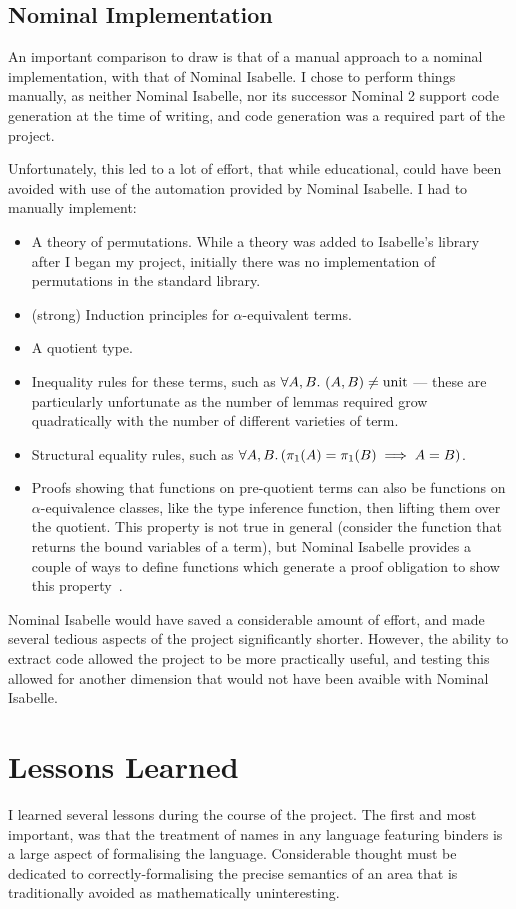 \subsection{Nominal Implementation}
An important comparison to draw is that of a manual approach to a nominal implementation, with that of Nominal Isabelle.
I chose to perform things manually, as neither Nominal Isabelle, nor its successor Nominal 2 support code generation at the time of writing, and code generation was a required part of the project.

Unfortunately, this led to a lot of effort, that while educational, could have been avoided with use of the automation provided by Nominal Isabelle.
I had to manually implement:
\begin{itemize}
\item
A theory of permutations.
While a theory was added to Isabelle's library after I began my project, initially there was no implementation of permutations in the standard library.
\item
(strong) Induction principles for \(\alpha\)-equivalent terms.
\item
A quotient type.
\item
Inequality rules for these terms, such as \(\forall A, B.\ (A, B) \neq \mathrm{unit}\) --- these are particularly unfortunate as the number of lemmas required grow quadratically with the number of different varieties of term.
\item
Structural equality rules, such as \(\forall A, B.\left(\pi_1(A) = \pi_1(B) \implies A = B\right)\).
\item
Proofs showing that functions on pre-quotient terms can also be functions on \(\alpha\)-equivalence classes, like the type inference function, then lifting them over the quotient.
This property is not true in general (consider the function that returns the bound variables of a term), but Nominal Isabelle provides a couple of ways to define functions which generate a proof obligation to show this property~\cite{fresh-fun}.
\end{itemize}

Nominal Isabelle would have saved a considerable amount of effort, and made several tedious aspects of the project significantly shorter.
However, the ability to extract code allowed the project to be more practically useful, and testing this allowed for another dimension that would not have been avaible with Nominal Isabelle.

\section{Lessons Learned}
\label{sec:lessons}
I learned several lessons during the course of the project.
The first and most important, was that the treatment of names in any language featuring binders is a large aspect of formalising the language.
Considerable thought must be dedicated to correctly-formalising the precise semantics of an area that is traditionally avoided as mathematically uninteresting.

